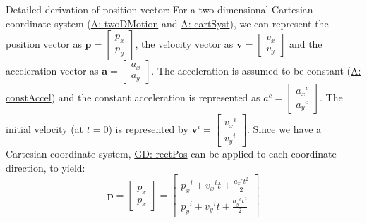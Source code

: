 \documentclass[12pt]{article}
\begin{document}
Detailed derivation of position vector:
For a two-dimensional Cartesian coordinate system (\hyperref[twoDMotion]{A: twoDMotion} and \hyperref[cartSyst]{A: cartSyst}), we can represent the position vector as $\mathbf{p}=\begin{bmatrix}
{p_{x}}\\
{p_{y}}
\end{bmatrix}$, the velocity vector as $\mathbf{v}=\begin{bmatrix}
{v_{x}}\\
{v_{y}}
\end{bmatrix}$ and the acceleration vector as $\mathbf{a}=\begin{bmatrix}
{a_{x}}\\
{a_{y}}
\end{bmatrix}$. The acceleration is assumed to be constant (\hyperref[constAccel]{A: constAccel}) and the constant acceleration is represented as ${a^{c}}=\begin{bmatrix}
{{a_{x}}^{c}}\\
{{a_{y}}^{c}}
\end{bmatrix}$. The initial velocity (at $t=0$) is represented by ${\mathbf{v}^{i}}=\begin{bmatrix}
{{v_{x}}^{i}}\\
{{v_{y}}^{i}}
\end{bmatrix}$. Since we have a Cartesian coordinate system, \hyperref[GD:rectPos]{GD: rectPos} can be applied to each coordinate direction, to yield:
\begin{displaymath}
\mathbf{p}=\begin{bmatrix}
{p_{x}}\\
{p_{x}}
\end{bmatrix}=\begin{bmatrix}
{{p_{x}}^{i}}+{{v_{x}}^{i}} t+\frac{{{a_{x}}^{c}} t^{2}}{2}\\
{{p_{y}}^{i}}+{{v_{y}}^{i}} t+\frac{{{a_{y}}^{c}} t^{2}}{2}
\end{bmatrix}
\end{displaymath}
\par~
\end{document}
